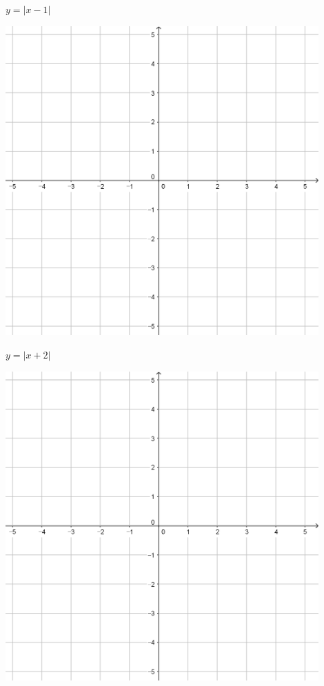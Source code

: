 \documentclass{oblivoir}
\begin{document}
\clearpage
\begin{minipage}{0.45\textwidth}\centering
\(y=|x-1|\)
\par\bigskip\includegraphics[width=0.9\textwidth]{55}
\end{minipage}
\begin{minipage}{0.45\textwidth}\centering
\(y=|x+2|\)
\par\bigskip\includegraphics[width=0.9\textwidth]{55}
\end{minipage}\bigskip\bigskip\par
\end{document}
